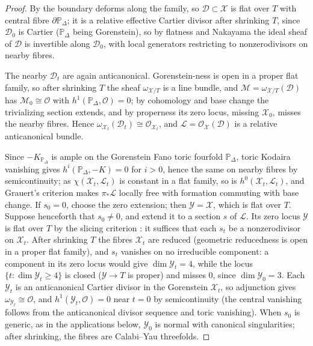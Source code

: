 \documentclass[11pt]{amsart}
\theoremstyle{definition}
\theoremstyle{remark}
\newcommand{\PP}{\mathbb{P}}
\begin{document}
\begin{proof}
By \cite[Thm.~6.1]{Petracci18} the boundary deforms along the family, so
$\mathcal{D}\subset\mathcal{X}$ is flat over $T$ with central fibre
$\partial\PP_\Delta$; it is a relative effective Cartier divisor after
shrinking $T$, since $\mathcal{D}_0$ is Cartier ($\PP_\Delta$ being
Gorenstein), so by flatness and Nakayama the ideal sheaf of $\mathcal{D}$
is invertible along $\mathcal{D}_0$, with local generators restricting to
nonzerodivisors on nearby fibres.

The nearby $\mathcal{D}_t$ are again anticanonical.  Gorenstein-ness is
open in a proper flat family, so after shrinking $T$ the sheaf
$\omega_{\mathcal{X}/T}$ is a line bundle, and
$\mathcal{M} = \omega_{\mathcal{X}/T}(\mathcal{D})$ has
$\mathcal{M}_0 \cong \mathcal{O}$ with $h^1(\PP_\Delta,\mathcal{O}) = 0$;
by cohomology and base change the trivializing section extends, and by
properness its zero locus, missing $\mathcal{X}_0$, misses the nearby
fibres.  Hence
$\omega_{\mathcal{X}_t}(\mathcal{D}_t) \cong \mathcal{O}_{\mathcal{X}_t}$,
and $\mathcal{L} = \mathcal{O}_{\mathcal{X}}(\mathcal{D})$ is a relative
anticanonical bundle.

Since $-K_{\PP_\Delta}$ is ample on the Gorenstein Fano toric fourfold
$\PP_\Delta$, toric Kodaira vanishing gives $h^i(\PP_\Delta, -K) = 0$ for
$i>0$, hence the same on nearby fibres by semicontinuity; as
$\chi(\mathcal{X}_t, \mathcal{L}_t)$ is constant in a flat family, so is
$h^0(\mathcal{X}_t, \mathcal{L}_t)$, and Grauert's criterion makes
$\pi_\ast\mathcal{L}$ locally free with formation commuting with base
change.  If $s_0=0$, choose the zero extension; then
$\mathcal Y=\mathcal X$, which is flat over $T$.  Suppose henceforth
that $s_0\ne0$, and extend it to a section $s$ of $\mathcal L$.
Its zero locus $\mathcal Y$ is flat over $T$ by the slicing criterion
\cite[Thm.~22.6]{Matsumura}: it suffices that each $s_t$ be a
nonzerodivisor on $\mathcal X_t$.  After shrinking $T$ the fibres
$\mathcal X_t$ are reduced (geometric reducedness is open in a proper
flat family), and $s_t$ vanishes on no irreducible component: a
component in its zero locus would give $\dim \mathcal Y_t = 4$, while
the locus $\{t : \dim \mathcal Y_t \ge 4\}$ is closed
($\mathcal Y \to T$ is proper) and misses $0$, since
$\dim \mathcal Y_0 = 3$.  Each
$\mathcal{Y}_t$ is an anticanonical Cartier divisor in the Gorenstein
$\mathcal{X}_t$, so adjunction gives
$\omega_{\mathcal{Y}_t} \cong \mathcal{O}$, and
$h^1(\mathcal{Y}_t,\mathcal{O}) = 0$ near $t=0$ by semicontinuity
(the central vanishing follows from the anticanonical divisor
sequence and toric vanishing).  When $s_0$ is generic, as in the
applications below, $\mathcal Y_0$ is normal with canonical
singularities; after shrinking, the fibres are Calabi--Yau threefolds.
\end{proof}
\end{document}
